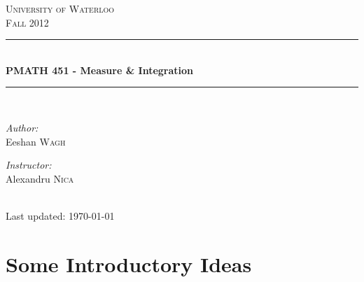 \documentclass[letterpaper, 12pt]{article}
\theoremstyle{stdthm}
\theoremstyle{stddef}
\theoremstyle{stdnonum}
\theoremstyle{stdqands}
\theoremstyle{stdbold}
\begin{document}
\begin{titlepage}
\begin{center}
\textsc{\LARGE University of Waterloo}\\[1cm]
\textsc{\Large Fall 2012}\\[0.5cm]
\rule{\linewidth}{0.5mm} \\[0.4cm]
{\Large \bf PMATH 451 - Measure \& Integration}\\[0.2cm]
\rule{\linewidth}{0.5mm} \\[1cm]
\begin{minipage}{0.4\textwidth}
\begin{flushleft} \large
\emph{Author:}\\
Eeshan \textsc{Wagh}
\end{flushleft}
\end{minipage}
\begin{minipage}{0.4\textwidth}
\begin{flushright} \large
\emph{Instructor:} \\
Alexandru \textsc{Nica}
\end{flushright}
\end{minipage}
\\[1cm]
Last updated: \today \\
\end{center}

\tableofcontents

\end{titlepage}

\newpage

\section{Some Introductory Ideas}
\end{document}
